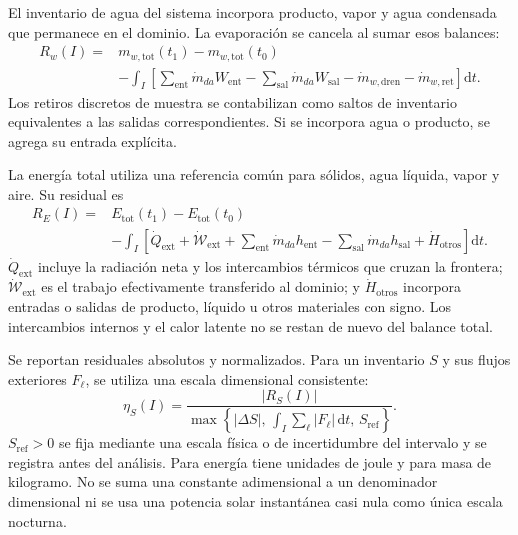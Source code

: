 El inventario de agua del sistema incorpora producto, vapor y agua condensada que permanece en el dominio. La evaporación se cancela al sumar esos balances:
\begin{equation}
\begin{split}
R_w(I)={}&m_{w,\mathrm{tot}}(t_1)-m_{w,\mathrm{tot}}(t_0)\\
&-\int_I\left[
\sum_{\mathrm{ent}}\dot m_{da}W_{\mathrm{ent}}
-\sum_{\mathrm{sal}}\dot m_{da}W_{\mathrm{sal}}
-\dot m_{w,\mathrm{dren}}
-\dot m_{w,\mathrm{ret}}
\right]\mathrm dt.
\end{split}
\label{met:residual_agua}
\end{equation}
Los retiros discretos de muestra se contabilizan como saltos de inventario equivalentes a las salidas correspondientes. Si se incorpora agua o producto, se agrega su entrada explícita.

La energía total utiliza una referencia común para sólidos, agua líquida, vapor y aire. Su residual es
\begin{equation}
\begin{split}
R_E(I)={}&E_{\mathrm{tot}}(t_1)-E_{\mathrm{tot}}(t_0)\\
&-\int_I\left[
\dot Q_{\mathrm{ext}}+\dot{\mathcal W}_{\mathrm{ext}}
+\sum_{\mathrm{ent}}\dot m_{da}h_{\mathrm{ent}}
-\sum_{\mathrm{sal}}\dot m_{da}h_{\mathrm{sal}}
+\dot H_{\mathrm{otros}}
\right]\mathrm dt.
\end{split}
\label{met:residual_energia}
\end{equation}
$\dot Q_{\mathrm{ext}}$ incluye la radiación neta y los intercambios térmicos que cruzan la frontera; $\dot{\mathcal W}_{\mathrm{ext}}$ es el trabajo efectivamente transferido al dominio; y $\dot H_{\mathrm{otros}}$ incorpora entradas o salidas de producto, líquido u otros materiales con signo. Los intercambios internos y el calor latente no se restan de nuevo del balance total.

Se reportan residuales absolutos y normalizados. Para un inventario $S$ y sus flujos exteriores $F_\ell$, se utiliza una escala dimensional consistente:
\begin{equation}
\eta_S(I)=
\frac{|R_S(I)|}
{\max\left\{
|\Delta S|,\,
\int_I\sum_\ell|F_\ell|\,\mathrm dt,\,
S_{\mathrm{ref}}
\right\}}.
\label{met:residual_normalizado}
\end{equation}
$S_{\mathrm{ref}}>0$ se fija mediante una escala física o de incertidumbre del intervalo y se registra antes del análisis. Para energía tiene unidades de joule y para masa de kilogramo. No se suma una constante adimensional a un denominador dimensional ni se usa una potencia solar instantánea casi nula como única escala nocturna.

